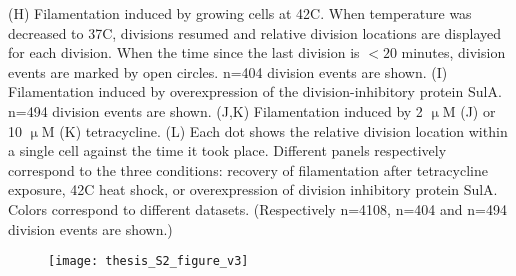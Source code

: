 {  (H) Filamentation induced by growing cells at 42C. When temperature was decreased to 37C, divisions resumed and relative division locations are displayed for each division. When the time since the last division is $<20$ minutes, division events are marked by open circles. n=404 division events are shown. 
  (I) Filamentation induced by overexpression of the division-inhibitory protein SulA. n=494 division events are shown.
  (J,K) Filamentation induced by 2 $\upmu$M (J) or 10 $\upmu$M 
  (K) tetracycline. 
  (L) Each dot shows the relative division location within a single cell against the time it took place. Different panels respectively correspond to the three conditions: recovery of filamentation after tetracycline exposure, 42C heat shock, or overexpression of division inhibitory protein SulA.
  Colors correspond to different datasets. 
  (Respectively n=4108, n=404 and n=494 division events are shown.) 
}
\endgroup



\begingroup %
\begin{figure}
	\centering
	\texttt{[image: thesis\_S2\_figure\_v3]}
\end{figure}	

\clearpage

